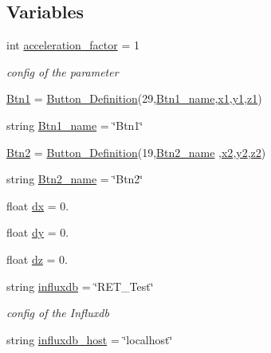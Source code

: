 \subsection*{Variables}
\begin{DoxyCompactItemize}
\item 
int \hyperlink{a00025_ac77790b4dfdf11c2ae7b5b9505ff0bd3}{acceleration\+\_\+factor} = 1
\begin{DoxyCompactList}\small\item\em config of the parameter \end{DoxyCompactList}\item 
\hyperlink{a00025_af037c6b9ff0314103d8127acc9d07e0b}{Btn1} = \hyperlink{a00053}{Button\+\_\+\+Definition}(29,\hyperlink{a00025_a96d98afcb35718dbc4c13c5bf74cfd5b}{Btn1\+\_\+name},\hyperlink{a00025_a3389d8b95846602e8f94cc15f41e48e9}{x1},\hyperlink{a00025_a9fe80bf4738047a31d7c162807ed85f0}{y1},\hyperlink{a00025_a7da4886c0a2e03b8bb9ed62eb20efb78}{z1})
\item 
string \hyperlink{a00025_a96d98afcb35718dbc4c13c5bf74cfd5b}{Btn1\+\_\+name} = \char`\"{}Btn1\char`\"{}
\item 
\hyperlink{a00025_a73afa8c52cebd94e1889df5fbe3bec66}{Btn2} = \hyperlink{a00053}{Button\+\_\+\+Definition}(19,\hyperlink{a00025_a9595d49d1fc79cce5a3f3af42cf8502a}{Btn2\+\_\+name} ,\hyperlink{a00025_a24d6ffb6e8780eef0c81cd97e3f4fdaf}{x2},\hyperlink{a00025_a07bcd014e69eddcf4243b2a961014eaf}{y2},\hyperlink{a00025_a55196b87940893e540ba636218f4eb07}{z2})
\item 
string \hyperlink{a00025_a9595d49d1fc79cce5a3f3af42cf8502a}{Btn2\+\_\+name} = \char`\"{}Btn2\char`\"{}
\item 
float \hyperlink{a00025_a9eae6c1f38db98ab568f3ed3771a969d}{dx} = 0.
\item 
float \hyperlink{a00025_a8f461b6142ce8725218813abb23b06a3}{dy} = 0.
\item 
float \hyperlink{a00025_a31755dd9c32708851ef90978cd814b35}{dz} = 0.
\item 
string \hyperlink{a00025_a6297da7d9cbabcbe91effb0271677ff3}{influxdb} = \char`\"{}R\+E\+T\+\_\+\+Test\char`\"{}
\begin{DoxyCompactList}\small\item\em config of the Influxdb \end{DoxyCompactList}\item 
string \hyperlink{a00025_a5ad590543d5ae7b0a89b3681d33928d8}{influxdb\+\_\+host} = \char`\"{}localhost\char`\"{}
\item 

\end{DoxyCompactItemize}
